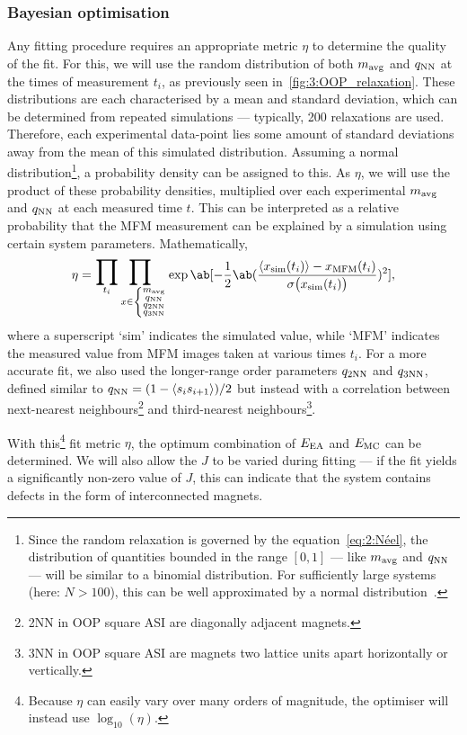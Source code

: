 \subsubsection{Bayesian optimisation}
Any fitting procedure requires an appropriate metric $\eta$ to determine the quality of the fit.
For this, we will use the random distribution of both $\mavg$ and $\qNN$ at the times of measurement $t_i$, as previously seen in~\cref{fig:3:OOP_relaxation}.
These distributions are each characterised by a mean and standard deviation, which can be determined from repeated simulations --- typically, 200 relaxations are used. %
Therefore, each experimental data-point lies some amount of standard deviations away from the mean of this simulated distribution.
Assuming a normal distribution\footnote{
	Since the random relaxation is governed by the  equation~\eqref{eq:2:Néel}, the distribution of quantities bounded in the range $[0,1]$ --- like $\mavg$ and $\qNN$ --- will be similar to a binomial distribution.
	For sufficiently large systems (here: $N > 100$), this can be well approximated by a normal distribution~\cite{DeMoivreLaplaceTheorem}.
}, a probability density can be assigned to this.
As  $\eta$, we will use the product of these probability densities, multiplied over each experimental $\mavg$ and $\qNN$ at each measured time $t$.
This can be interpreted as a relative probability that the MFM measurement can be explained by a simulation using certain system parameters.
Mathematically,
\begin{equation}
	\eta = \bigprod_{t_i} \bigprod_{x \in \left\{\substack{\mavg\\\qNN\\\qNN[2]\\\qNN[3]}\right.} \exp\ab[-\frac{1}{2} \ab(\frac{\langle x_\mathrm{sim}(t_i) \rangle - x_\mathrm{MFM}(t_i)}{\sigma\big(x_\mathrm{sim}(t_i)\big)})^2] \mathrm{,}
\end{equation}
where a superscript `sim' indicates the simulated value, while `MFM' indicates the measured value from MFM images taken at various times $t_i$.
For a more accurate fit, we also used the longer-range order parameters $\qNN[2]$ and $\qNN[3]$, defined similar to $\qNN = (1 - \langle s_i s_{i+1} \rangle)/2$ but instead with a correlation between next-nearest neighbours\footnote{
	2NN in OOP square ASI are diagonally adjacent magnets.
} and third-nearest neighbours\footnote{
	3NN in OOP square ASI are magnets two lattice units apart horizontally or vertically.
}. \par
With this\footnote{
	Because $\eta$ can easily vary over many orders of magnitude, the optimiser will instead use $\log_{10}(\eta)$.
} fit metric $\eta$, the optimum combination of $\EEA$ and $\EMC$ can be determined.
We will also allow the  $J$ to be varied during fitting --- if the fit yields a significantly non-zero value of $J$, this can indicate that the system contains defects in the form of interconnected magnets. \par %

